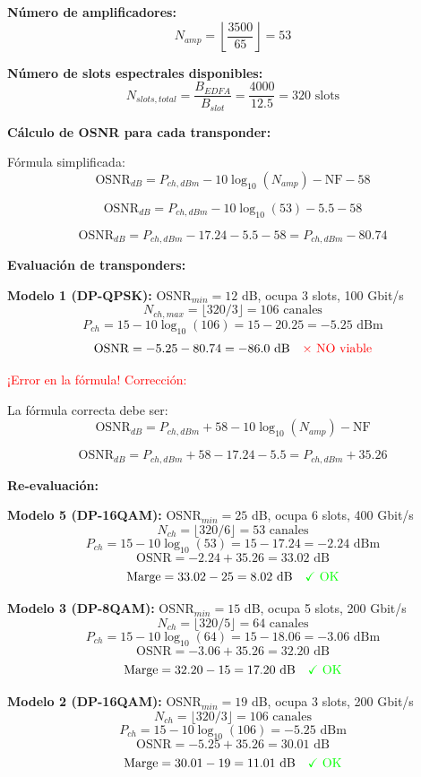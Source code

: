 \documentclass[12pt,a4paper]{extarticle}
\begin{document}
\textbf{Número de amplificadores:}
$$N_{amp} = \left\lfloor \frac{3500}{65} \right\rfloor = 53$$

\textbf{Número de slots espectrales disponibles:}
$$N_{slots,total} = \frac{B_{EDFA}}{B_{slot}} = \frac{4000}{12.5} = 320 \text{ slots}$$

\textbf{Cálculo de OSNR para cada transponder:}

Fórmula simplificada:
$$\text{OSNR}_{dB} = P_{ch,dBm} - 10\log_{10}(N_{amp}) - \text{NF} - 58$$

$$\text{OSNR}_{dB} = P_{ch,dBm} - 10\log_{10}(53) - 5.5 - 58$$

$$\text{OSNR}_{dB} = P_{ch,dBm} - 17.24 - 5.5 - 58 = P_{ch,dBm} - 80.74$$

\textbf{Evaluación de transponders:}

\textbf{Modelo 1 (DP-QPSK):} OSNR$_{min} = 12$ dB, ocupa 3 slots, 100 Gbit/s
$$N_{ch,max} = \lfloor 320/3 \rfloor = 106 \text{ canales}$$
$$P_{ch} = 15 - 10\log_{10}(106) = 15 - 20.25 = -5.25 \text{ dBm}$$
$$\text{OSNR} = -5.25 - 80.74 = -86.0 \text{ dB} \quad \textcolor{red}{\times \text{ NO viable}}$$

\textcolor{red}{¡Error en la fórmula! Corrección:}

La fórmula correcta debe ser:
$$\text{OSNR}_{dB} = P_{ch,dBm} + 58 - 10\log_{10}(N_{amp}) - \text{NF}$$

$$\text{OSNR}_{dB} = P_{ch,dBm} + 58 - 17.24 - 5.5 = P_{ch,dBm} + 35.26$$

\textbf{Re-evaluación:}

\textbf{Modelo 5 (DP-16QAM):} OSNR$_{min} = 25$ dB, ocupa 6 slots, 400 Gbit/s
$$N_{ch} = \lfloor 320/6 \rfloor = 53 \text{ canales}$$
$$P_{ch} = 15 - 10\log_{10}(53) = 15 - 17.24 = -2.24 \text{ dBm}$$
$$\text{OSNR} = -2.24 + 35.26 = 33.02 \text{ dB}$$
$$\text{Marge} = 33.02 - 25 = 8.02 \text{ dB} \quad \textcolor{green}{\checkmark \text{ OK}}$$

\textbf{Modelo 3 (DP-8QAM):} OSNR$_{min} = 15$ dB, ocupa 5 slots, 200 Gbit/s
$$N_{ch} = \lfloor 320/5 \rfloor = 64 \text{ canales}$$
$$P_{ch} = 15 - 10\log_{10}(64) = 15 - 18.06 = -3.06 \text{ dBm}$$
$$\text{OSNR} = -3.06 + 35.26 = 32.20 \text{ dB}$$
$$\text{Marge} = 32.20 - 15 = 17.20 \text{ dB} \quad \textcolor{green}{\checkmark \text{ OK}}$$

\textbf{Modelo 2 (DP-16QAM):} OSNR$_{min} = 19$ dB, ocupa 3 slots, 200 Gbit/s
$$N_{ch} = \lfloor 320/3 \rfloor = 106 \text{ canales}$$
$$P_{ch} = 15 - 10\log_{10}(106) = -5.25 \text{ dBm}$$
$$\text{OSNR} = -5.25 + 35.26 = 30.01 \text{ dB}$$
$$\text{Marge} = 30.01 - 19 = 11.01 \text{ dB} \quad \textcolor{green}{\checkmark \text{ OK}}$$
\end{document}
